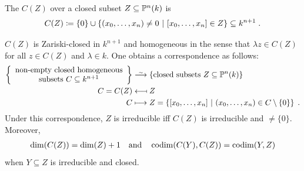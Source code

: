 \documentclass[a4paper,parskip=half,numbers=enddot, DIV=12]{scrreprt}
\begin{document}
\begin{defi}
The  $C(Z)$ over a closed subset $Z\subseteq \mathbb{P}^n(k)$ is \begin{align*}C(Z)\coloneqq\{0\} \cup \left\{(x_0,\ldots,x_n)\neq 0 \ \middle|\ 
[x_0,\ldots,x_n]\in Z\right\}\subseteq k^{n+1}\;.
\end{align*}
\end{defi}
\begin{prop}
$C(Z)$ is Zariski-closed in $k^{n+1}$ and homogeneous in the sense that $\lambda z\in C(Z)$ for all $z\in C(Z)$ and $\lambda\in k$.
One obtains a correspondence as follows:
\begin{align*}
\left\{
\begin{array}{c}
\text{non-empty closed homogeneous}\\
 \text{subsets }C\subseteq k^{n+1}
\end{array}
\right\}&\isomorphism\left\{\text{closed subsets }Z\subseteq \IP^n(k)\right\}\\
C=C(Z)&\longmapsfrom Z\\
C&\longmapsto Z = \left\{[x_0,\ldots,x_n] \st (x_0,\ldots,x_n)\in C\setminus \{0\}\right\}\;.
\end{align*}
Under this correspondence, $Z$ is irreducible iff $C(Z)$ is irreducible and $\neq\{0\}$. Moreover, 
\begin{align*}
	\dim(C(Z)) = \dim(Z)+1\quad\text{and}\quad\operatorname{codim}(C(Y),C(Z)) = \operatorname{codim}(Y,Z)
\end{align*}
 when $Y\subseteq Z$ is irreducible and closed.
\end{prop}
\end{document}
